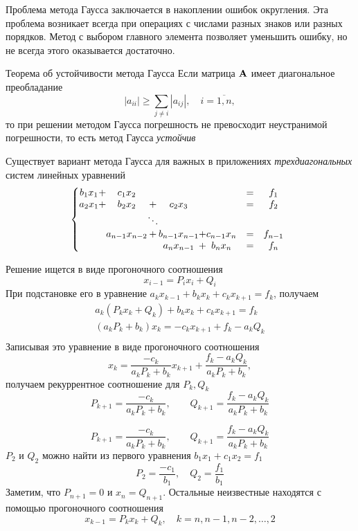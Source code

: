 \documentclass[professionalfonts,compress,unicode]{beamer}
\begin{document}
{
	Проблема метода Гаусса заключается в накоплении ошибок округления. Эта проблема возникает всегда при 
	операциях с числами разных знаков или разных порядков. Метод с выбором главного элемента позволяет уменьшить ошибку,
	но не всегда этого оказывается достаточно.
	
	\begin{block}{Теорема об устойчивости метода Гаусса}
		Если матрица ${\bf A}$ имеет диагональное преобладание
		$$
			|a_{ii}| \geq \sum_{j \neq i} |a_{ij}|,\quad i = \overline{1,n},
		$$
		то при решении методом Гаусса погрешность не превосходит неустранимой погрешности, то есть
		метод Гаусса \emph{устойчив}
	\end{block}
}

{
	Существует вариант метода Гаусса для важных в приложениях \emph{трехдиагональных} систем линейных уравнений
	$$
	\left\{
	\begin{array}{@{}c@{}c@{}c@{}c@{}c@{}c@{}ccc}
	b_1 x_1 &+& c_1 x_2 &&   && &=& f_1\\
	a_2 x_1 &+& b_2 x_2 &+& c_2 x_3 && &=& f_2\\
	&&&\ddots\\
	&& a_{n-1} x_{n-2} &+& b_{n-1} x_{n-1} &+& c_{n-1} x_n &=& f_{n-1}\\
	&&&& a_{n} x_{n-1} &+& b_{n} x_{n} &=& f_{n}\\
	\end{array}
	\right.
	$$
}

{
	Решение ищется в виде прогоночного соотношения
	$$
	x_{i-1} = P_{i} x_{i} + Q_{i}
	$$
	При подстановке его в уравнение $a_k x_{k-1} + b_k x_k + c_k x_{k+1} = f_k$, получаем
	\begin{align*}
	a_k (P_k x_k + Q_k) + b_k x_k + c_k x_{k+1} = f_{k}\\
	(a_k P_k + b_k) x_k = - c_k x_{k+1} + f_{k} - a_k Q_k\\
	\end{align*}
	Записывая это уравнение в виде прогоночного соотношения
	$$
	x_{k} = \frac{-c_k}{a_k P_k + b_k} x_{k+1} + \frac{f_k - a_k Q_k}{a_k P_k + b_k},
	$$
	получаем рекуррентное соотношение для $P_k, Q_k$
	$$
	P_{k+1} = \frac{-c_k}{a_k P_k + b_k}, \qquad Q_{k+1} = \frac{f_k - a_k Q_k}{a_k P_k + b_k}
	$$
}

{
	$$
	P_{k+1} = \frac{-c_k}{a_k P_k + b_k}, \qquad Q_{k+1} = \frac{f_k - a_k Q_k}{a_k P_k + b_k}
	$$
	$P_2$ и $Q_2$ можно найти из первого уравнения $b_1 x_1 + c_1 x_2 = f_1$
	$$
	P_2 = \frac{-c_1}{b_1}, \quad Q_2 = \frac{f_1}{b_1}
	$$
	Заметим, что $P_{n+1} = 0$ и $x_n = Q_{n+1}$.
	Остальные неизвестные находятся с помощью прогоночного соотношения
	$$
	x_{k-1} = P_k x_k + Q_k, \quad k = n, n-1, n-2, \dots, 2
	$$
}
\end{document}

